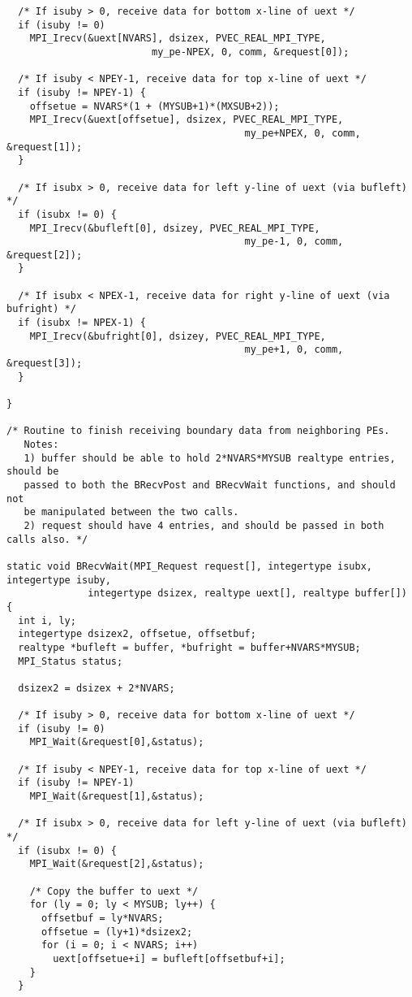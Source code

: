 \begin{verbatim}
  /* If isuby > 0, receive data for bottom x-line of uext */
  if (isuby != 0)
    MPI_Irecv(&uext[NVARS], dsizex, PVEC_REAL_MPI_TYPE,
                         my_pe-NPEX, 0, comm, &request[0]);

  /* If isuby < NPEY-1, receive data for top x-line of uext */
  if (isuby != NPEY-1) {
    offsetue = NVARS*(1 + (MYSUB+1)*(MXSUB+2));
    MPI_Irecv(&uext[offsetue], dsizex, PVEC_REAL_MPI_TYPE,
                                         my_pe+NPEX, 0, comm, &request[1]);
  }

  /* If isubx > 0, receive data for left y-line of uext (via bufleft) */
  if (isubx != 0) {
    MPI_Irecv(&bufleft[0], dsizey, PVEC_REAL_MPI_TYPE,
                                         my_pe-1, 0, comm, &request[2]);
  }

  /* If isubx < NPEX-1, receive data for right y-line of uext (via bufright) */
  if (isubx != NPEX-1) {
    MPI_Irecv(&bufright[0], dsizey, PVEC_REAL_MPI_TYPE,
                                         my_pe+1, 0, comm, &request[3]);
  }

}

/* Routine to finish receiving boundary data from neighboring PEs.
   Notes:
   1) buffer should be able to hold 2*NVARS*MYSUB realtype entries, should be
   passed to both the BRecvPost and BRecvWait functions, and should not
   be manipulated between the two calls.
   2) request should have 4 entries, and should be passed in both calls also. */

static void BRecvWait(MPI_Request request[], integertype isubx, integertype isuby,
              integertype dsizex, realtype uext[], realtype buffer[])
{
  int i, ly;
  integertype dsizex2, offsetue, offsetbuf;
  realtype *bufleft = buffer, *bufright = buffer+NVARS*MYSUB;
  MPI_Status status;

  dsizex2 = dsizex + 2*NVARS;

  /* If isuby > 0, receive data for bottom x-line of uext */
  if (isuby != 0)
    MPI_Wait(&request[0],&status);

  /* If isuby < NPEY-1, receive data for top x-line of uext */
  if (isuby != NPEY-1)
    MPI_Wait(&request[1],&status);

  /* If isubx > 0, receive data for left y-line of uext (via bufleft) */
  if (isubx != 0) {
    MPI_Wait(&request[2],&status);

    /* Copy the buffer to uext */
    for (ly = 0; ly < MYSUB; ly++) {
      offsetbuf = ly*NVARS;
      offsetue = (ly+1)*dsizex2;
      for (i = 0; i < NVARS; i++)
        uext[offsetue+i] = bufleft[offsetbuf+i];
    }
  }


\end{verbatim}
